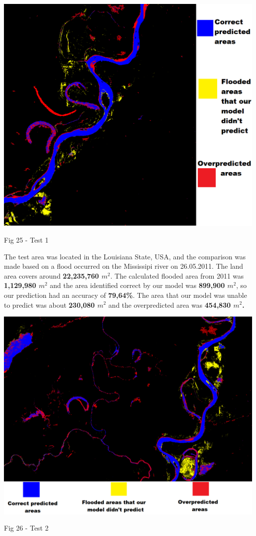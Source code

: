 \documentclass[12pt, a4paper]{report}
\begin{document}
\bigskip
\includegraphics[scale=0.6, center]{test_1.png}
\begin{center}
Fig 25 - Test 1
\end{center}
\par 

The test area was located in the Louisiana State, USA, and the comparison was made based on a flood occurred on the Mississipi river on 26.05.2011. The land area covers around \textbf{22,235,760 $m^2$}. The calculated flooded area from 2011 was \textbf{1,129,980 $m^2$} and the area identified correct by our model was \textbf{899,900 $m^2$}, so our prediction had an accuracy of \textbf{79,64\%}. The area that our model was unable to predict was about \textbf{230,080 $m^2$} and the overpredicted area was \textbf{454,830 $m^2$.}

\newpage

\bigskip
\includegraphics[scale=0.5, center]{test_2.png}
\begin{center}
Fig 26 - Test 2 
\end{center}
\par 
\end{document}

